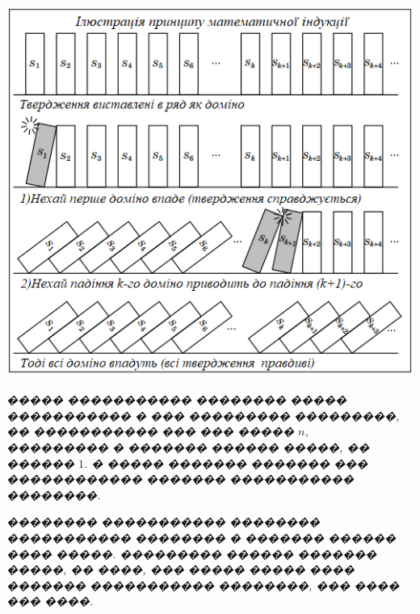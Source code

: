\documentclass[a4paper,12pt]{article}
\begin{document}
\begin{minipage}{.50\textwidth}
\begin{center}
\includegraphics[scale=0.6]{domino_math.png}
\end{center}

\end{minipage}
\begin{minipage}{.40\textwidth}


\textit{����� ����������� �������� ����� ����������� � ��� ���������
���������, �� ����������� ��� ��� ����� $n$, ��������� � ������� ������ �����,
�� ������ $1$. � ����� ������� ������� ��� ������������ �������
����������� ��������.}

\textit{�������� ����������� �������� ����������� �������� � ������� ������ ���� �����. ��������� ������ ������� �����, �� ����, ��� ����� ����� ���� ������� ����������� ��������, ��� ���� ��� ����.}
\end{minipage}






\medskip\medskip\medskip
\end{document}
